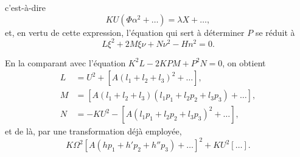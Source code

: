 \documentclass[12pt,a4paper]{article}
\theoremstyle{definition}
\begin{document}
c'est-\`{a}-dire
\[
KU(\Phi \alpha^2 + \ldots) = \lambda X + \ldots,
\]
et, en vertu de cette expression, l'\'{e}quation qui sert \`{a} d\'{e}terminer $P$ se r\'{e}duit \`{a}
\begin{equation}\tag{20}
L\xi^2 + 2M\xi \nu + N\nu^2 - Hn^2 = 0.
\end{equation}

En la comparant avec l'\'{e}quation $K^2L - 2KPM + P^2N = 0$, on obtient
\begin{equation}\tag{21}
\begin{aligned}
L &= U^2 + [A(l_1 + l_2 + l_3)^2 + \ldots], \\
M &= [A(l_1 + l_2 + l_3)(l_1 p_1 + l_2 p_2 + l_3 p_3) + \ldots], \\
N &= -KU^2 - [A(l_1 p_1 + l_2 p_2 + l_3 p_3)^2 + \ldots],
\end{aligned}
\end{equation}
et de l\`{a}, par une transformation d\'{e}j\`{a} employ\'{e}e,
\begin{equation}\tag{22}
K\Omega^2 [A(h p_1 + h' p_2 + h'' p_3) + \ldots]^2 + KU^2 [\ldots].
\end{equation}
\end{document}
